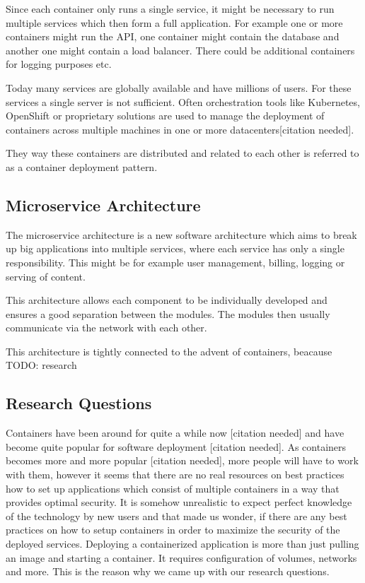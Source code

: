 \documentclass[conference]{IEEEtran}
\begin{document}
Since each container only runs a single service, it might be necessary to run multiple services which then form a full application. For example one or more containers might run the API, one container might contain the database and another one might contain a load balancer. There could be additional containers for logging purposes etc.

Today many services are globally available and have millions of users. For these services a single server is not sufficient. Often orchestration tools like Kubernetes, OpenShift or proprietary solutions are used to manage the deployment of containers across multiple machines in one or more datacenters[citation needed].

They way these containers are distributed and related to each other is referred to as a container deployment pattern.

\subsection{Microservice Architecture}

The microservice architecture is a new software architecture which aims to break up big applications into multiple services, where each service has only a single responsibility. This might be for example user management, billing, logging or serving of content.

This architecture allows each component to be individually developed and ensures a good separation between the modules. The modules then usually communicate via the network with each other.

This architecture is tightly connected to the advent of containers, beacause TODO: research

\subsection{Research Questions}

Containers have been around for quite a while now [citation needed] and have become quite popular for software deployment [citation needed]. As containers becomes more and more popular [citation needed], more people will have to work with them, however it seems that there are no real resources on best practices how to set up applications which consist of multiple containers in a way that provides optimal security. It is somehow unrealistic to expect perfect knowledge of the technology by new users and that made us wonder, if there are any best practices on how to setup containers in order to maximize the security of the deployed services. Deploying a containerized application is more than just pulling an image and starting a container. It requires configuration of volumes, networks and more. This is the reason why we came up with our research questions.
\end{document}
